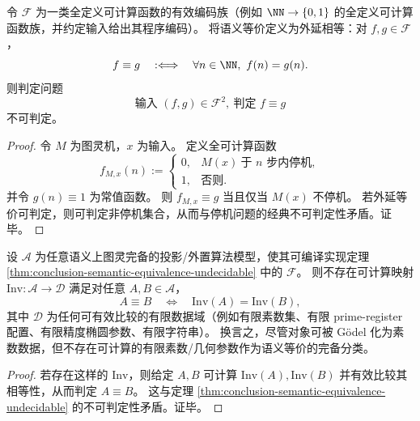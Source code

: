 \begin{theorem}\label{thm:conclusion-semantic-equivalence-undecidable}
令 \(\mathcal F\) 为一类全定义可计算函数的有效编码族（例如 \(\NN\to\{0,1\}\) 的全定义可计算函数族，并约定输入给出其程序编码）。
将语义等价定义为外延相等：对 \(f,g\in\mathcal F\)，
\[
f\equiv g\quad:\Longleftrightarrow\quad \forall n\in\NN,\ f(n)=g(n).
\]
则判定问题
\[
\text{输入 }(f,g)\in\mathcal F^2,\ \text{判定 }f\equiv g
\]
不可判定。
\end{theorem}

\begin{proof}
令 \(M\) 为图灵机，\(x\) 为输入。
定义全可计算函数
\[
f_{M,x}(n):=
\begin{cases}
0,& M(x)\ \text{于 }n\text{ 步内停机},\\
1,& \text{否则}.
\end{cases}
\]
并令 \(g(n)\equiv 1\) 为常值函数。
则 \(f_{M,x}\equiv g\) 当且仅当 \(M(x)\) 不停机。
若外延等价可判定，则可判定非停机集合，从而与停机问题的经典不可判定性矛盾。证毕。
\end{proof}

\begin{corollary}[不存在可计算的有限素数完备不变量]\label{cor:conclusion-no-computable-finite-prime-complete-invariant}
设 \(\mathcal A\) 为任意语义上图灵完备的投影/外置算法模型，使其可编译实现定理 \ref{thm:conclusion-semantic-equivalence-undecidable} 中的 \(\mathcal F\)。
则不存在可计算映射 \(\mathrm{Inv}:\mathcal A\to\mathcal D\) 满足对任意 \(A,B\in\mathcal A\)，
\[
A\equiv B\quad\Longleftrightarrow\quad \mathrm{Inv}(A)=\mathrm{Inv}(B),
\]
其中 \(\mathcal D\) 为任何可有效比较的有限数据域（例如有限素数集、有限 prime-register 配置、有限精度椭圆参数、有限字符串）。
换言之，尽管对象可被 Gödel 化为素数数据，但不存在可计算的有限素数/几何参数作为语义等价的完备分类。
\end{corollary}

\begin{proof}
若存在这样的 \(\mathrm{Inv}\)，则给定 \(A,B\) 可计算 \(\mathrm{Inv}(A),\mathrm{Inv}(B)\) 并有效比较其相等性，从而判定 \(A\equiv B\)。
这与定理 \ref{thm:conclusion-semantic-equivalence-undecidable} 的不可判定性矛盾。证毕。
\end{proof}

